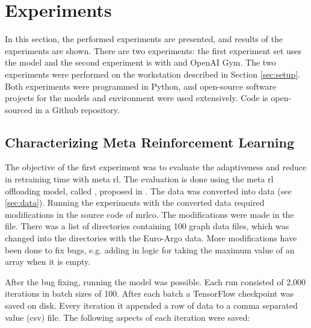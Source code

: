 \chapter{Experiments}\label{sec:experiments}

In this section, the performed experiments are presented, and results of the
experiments are shown. There are two experiments: the first experiment set
uses the \mrlco model and the second experiment is with  and
OpenAI Gym. The two experiments were performed on the workstation described in
Section \ref{sec:setup}. Both experiments were programmed in Python, and
open-source software projects for the models and environment were used
extensively. Code is open-sourced in a Github
repository.

\section{Characterizing Meta Reinforcement Learning}

The objective of the first experiment was to evaluate the adaptiveness and
reduce in retraining time with meta \gls{rl}. The evaluation is done using the
meta \gls{rl} offloading model, called \mrlco, proposed in .
The data was converted into \DAG data (see \ref{sec:data}). Running the
experiments with the converted data required modifications in the source code
of \gls{mrlco}. The modifications were made in the 
file. There was a list of directories containing 100 graph data files, which
was changed into the directories with the Euro-Argo data. More modifications
have been done to fix bugs, e.g. adding in logic for taking the maximum value
of an array when it is empty.

After the bug fixing, running the model was possible. Each run consisted of
2,000 iterations in batch sizes of 100. After each batch a TensorFlow
checkpoint was saved on disk. Every iteration it appended a row of data to a
comma separated value (csv) file. The following aspects of each iteration were
saved:

